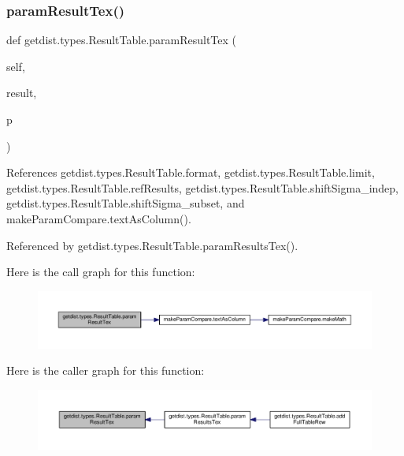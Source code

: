 \subsubsection{\texorpdfstring{param\+Result\+Tex()}{paramResultTex()}}
{\footnotesize\ttfamily def getdist.\+types.\+Result\+Table.\+param\+Result\+Tex (\begin{DoxyParamCaption}\item[{}]{self,  }\item[{}]{result,  }\item[{}]{p }\end{DoxyParamCaption})}



References getdist.\+types.\+Result\+Table.\+format, getdist.\+types.\+Result\+Table.\+limit, getdist.\+types.\+Result\+Table.\+ref\+Results, getdist.\+types.\+Result\+Table.\+shift\+Sigma\+\_\+indep, getdist.\+types.\+Result\+Table.\+shift\+Sigma\+\_\+subset, and make\+Param\+Compare.\+text\+As\+Column().



Referenced by getdist.\+types.\+Result\+Table.\+param\+Results\+Tex().

Here is the call graph for this function\+:
\nopagebreak
\begin{figure}[H]
\begin{center}
\leavevmode
\includegraphics[width=350pt]{classgetdist_1_1types_1_1ResultTable_a685e0efc6bb8273a2ea109022fc5da59_cgraph}
\end{center}
\end{figure}
Here is the caller graph for this function\+:
\nopagebreak
\begin{figure}[H]
\begin{center}
\leavevmode
\includegraphics[width=350pt]{classgetdist_1_1types_1_1ResultTable_a685e0efc6bb8273a2ea109022fc5da59_icgraph}
\end{center}
\end{figure}
\mbox{\label{classgetdist_1_1types_1_1ResultTable_a515896c352e07b23284d0fca028f4a04}} 
